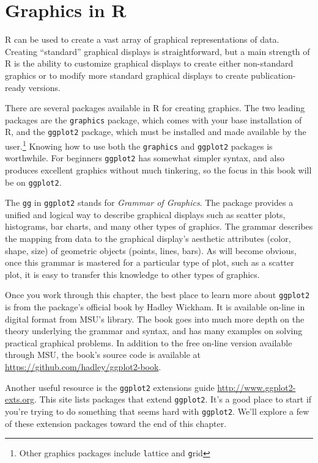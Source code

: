 \documentclass[12pt,oneside]{book}\usepackage[]{graphicx}\usepackage[]{color}
\begin{document}
\chapter{Graphics in R}
R can be used to create a vast array of graphical representations of data. Creating ``standard'' graphical displays is straightforward, but a main strength of R is the ability to customize graphical displays to create either non-standard graphics or to modify more standard graphical displays to create publication-ready versions.

There are several packages available in R for creating graphics. The two leading packages are the \verb+graphics+ package, which comes with your base installation of R, and the \verb+ggplot2+ package, which must be installed and made available by the user.\footnote{Other graphics packages include {\texttt lattice} and {\texttt grid}}  Knowing how to use both the \verb+graphics+ and \verb+ggplot2+ packages is worthwhile. For beginners \verb+ggplot2+ has somewhat simpler syntax, and also produces excellent graphics without much tinkering, so the focus in this book will be on \verb+ggplot2+. 

The \verb+gg+ in \verb+ggplot2+ stands for \emph{Grammar of Graphics}. The package provides a unified and logical way to describe graphical displays such as scatter plots, histograms, bar charts, and many other types of graphics. The grammar describes the mapping from data to the graphical display's aesthetic attributes (color, shape, size) of geometric objects (points, lines, bars). As will become obvious, once this grammar is mastered for a particular type of plot, such as a scatter plot, it is easy to transfer this knowledge to other types of graphics.  

Once you work through this chapter, the best place to learn more about \verb+ggplot2+ is from the package's official book \citet{WickhamGgplot2Book} by Hadley Wickham. It is available on-line in digital format from MSU's library. The book goes into much more depth on the theory underlying the grammar and syntax, and has many examples on solving practical graphical problems. In addition to the free on-line version available through MSU, the book's source code is available at \url{https://github.com/hadley/ggplot2-book}.

Another useful resource is the \verb+ggplot2+ extensions guide \url{http://www.ggplot2-exts.org}. This site lists packages that extend \verb+ggplot2+. It's a good place to start if you're trying to do something that seems hard with \verb+ggplot2+. We'll explore a few of these extension packages toward the end of this chapter.
\end{document}
